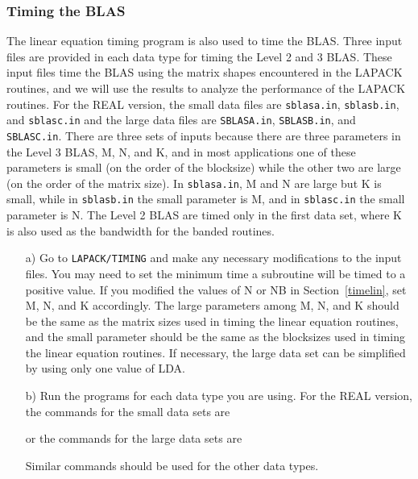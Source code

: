 \documentclass[11pt]{report}
\begin{document}
\subsubsection{Timing the BLAS}\label{timeblas}

The linear equation timing program is also used to time the BLAS.
Three input files are provided in each data type for timing the Level
2 and 3 BLAS. 
These input files time the BLAS using the matrix shapes encountered
in the LAPACK routines, and we will use the results to analyze the
performance of the LAPACK routines. 
For the REAL version, the small data files are
\texttt{sblasa.in}, \texttt{sblasb.in}, and \texttt{sblasc.in}
and the large data files are
\texttt{SBLASA.in}, \texttt{SBLASB.in}, and \texttt{SBLASC.in}.
There are three sets of inputs because there are three
parameters in the Level 3 BLAS, M, N, and K, and
in most applications one of these parameters is small (on the order
of the blocksize) while the other two are large (on the order of the
matrix size).  
In \texttt{sblasa.in}, M and N are large but K is
small, while in \texttt{sblasb.in} the small parameter is M, and
in \texttt{sblasc.in} the small parameter is N.  
The Level 2 BLAS are timed only in the first data set, where K
is also used as the bandwidth for the banded routines.

\begin{itemize}

\item[a)]
Go to \texttt{LAPACK/TIMING} and
make any necessary modifications to the input files.
You may need to set the minimum time a subroutine will
be timed to a positive value.
If you modified the values of N or NB 
in Section~\ref{timelin}, set M, N, and K accordingly.
The large parameters among M, N, and K
should be the same as the matrix sizes used in timing the linear
equation routines,
and the small parameter should be the same as the
blocksizes used in timing the linear equation routines.
If necessary, the large data set can be simplified by using only one
value of LDA.

\item[b)]
Run the programs for each data type you are using. 
For the REAL version, the commands for the small data sets are

or the commands for the large data sets are

\noindent
Similar commands should be used for the other data types.
\end{itemize}
\end{document}
